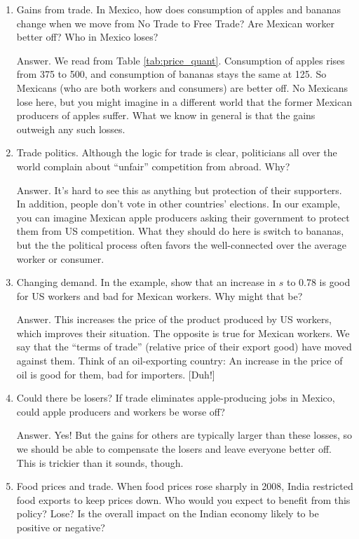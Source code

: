 \setlength{\leftmargini}{0.5\oldleftmargini}
\begin{enumerate}
\item Gains from trade. In Mexico, how does consumption
of apples and bananas change when we move from No Trade to Free Trade?
Are Mexican worker better off?
Who in Mexico loses?

Answer.  We read from Table \ref{tab:price_quant}.
Consumption of apples rises from 375 to 500,
and consumption of bananas stays the same at 125.
So Mexicans (who are both workers and consumers) are better off.
No Mexicans lose here, but you might imagine in a different world
that the former Mexican producers of apples suffer.
What we know in general is that the gains outweigh any such losses.

\item Trade politics.
Although the logic for trade is clear,
politicians all over the world complain about ``unfair'' competition
from abroad.
Why?

Answer.
It's hard to see this as anything but protection of their supporters.
In addition, people don't vote in other countries' elections.
In our example, you can imagine Mexican apple producers asking their
government to protect them from US competition.
What they should do here is switch to bananas, but the
the political process often favors the well-connected over the
average worker or consumer.


\item Changing demand.
In the example, show that an increase in $s$ to 0.78
is good for US workers and bad for Mexican workers.
Why might that be?

Answer.  This increases the price of the product produced by US workers,
which improves their situation.  The opposite is true for Mexican workers.
We say that the ``terms of trade'' (relative price of their export good) have moved against them.
Think of an oil-exporting country:  An increase in the price of oil
is good for them, bad for importers.  [Duh!]

\item Could there be losers?
If trade eliminates apple-producing jobs in Mexico,
could apple producers and workers be worse off?

Answer.  Yes!  But the gains for others are typically
larger than these losses,
so we should be able to compensate the losers and leave
everyone better off.
This is trickier than it sounds, though.

\item Food prices and trade.
When food prices rose sharply in 2008, India restricted
food exports to keep prices down.
Who would you expect to benefit from this policy?  Lose?
Is the overall impact on the Indian economy likely to be
positive or negative?


\end{enumerate}
